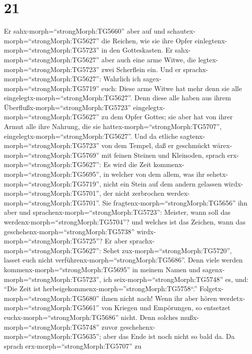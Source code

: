 \hypertarget{section-20}{%
\section{21}\label{section-20}}

 Er sahx-morph=``strongMorph:TG5660'' aber auf und
schautex-morph=``strongMorph:TG5627'' die Reichen, wie sie ihre Opfer
einlegtenx-morph=``strongMorph:TG5723'' in den Gotteskasten.
 Er sahx-morph=``strongMorph:TG5627'' aber auch eine arme
Witwe, die legtex-morph=``strongMorph:TG5723'' zwei Scherflein ein.
 Und er sprachx-morph=``strongMorph:TG5627'': Wahrlich ich
sagex-morph=``strongMorph:TG5719'' euch: Diese arme Witwe hat mehr denn
sie alle eingelegtx-morph=``strongMorph:TG5627''.  Denn
diese alle haben aus ihrem Überflußx-morph=``strongMorph:TG5723''
eingelegtx-morph=``strongMorph:TG5627'' zu dem Opfer Gottes; sie aber
hat von ihrer Armut alle ihre Nahrung, die sie
hattex-morph=``strongMorph:TG5707'',
eingelegtx-morph=``strongMorph:TG5627''.  Und da etliche
sagtenx-morph=``strongMorph:TG5723'' von dem Tempel, daß er geschmückt
wärex-morph=``strongMorph:TG5769'' mit feinen Steinen und Kleinoden,
sprach erx-morph=``strongMorph:TG5627'':  Es wird die Zeit
kommenx-morph=``strongMorph:TG5695'', in welcher von dem allem, was ihr
sehetx-morph=``strongMorph:TG5719'', nicht ein Stein auf dem andern
gelassen wirdx-morph=``strongMorph:TG5701'', der nicht zerbrochen
werdex-morph=``strongMorph:TG5701''.  Sie
fragtenx-morph=``strongMorph:TG5656'' ihn aber und
sprachenx-morph=``strongMorph:TG5723'': Meister, wann soll das
werdenx-morph=``strongMorph:TG5704''? und welches ist das Zeichen, wann
das geschehenx-morph=``strongMorph:TG5738''
wirdx-morph=``strongMorph:TG5725''?  Er aber
sprachx-morph=``strongMorph:TG5627'': Sehet
zux-morph=``strongMorph:TG5720'', lasset euch nicht
verführenx-morph=``strongMorph:TG5686''. Denn viele werden
kommenx-morph=``strongMorph:TG5695'' in meinem Namen und
sagenx-morph=``strongMorph:TG5723'', ich
seix-morph=``strongMorph:TG5748'' es, und: ``Die Zeit ist
herbeigekommenx-morph=''strongMorph:TG5758``.''
Folgetx-morph=``strongMorph:TG5680'' ihnen nicht nach!  Wenn
ihr aber hören werdetx-morph=``strongMorph:TG5661'' von Kriegen und
Empörungen, so entsetzet euchx-morph=``strongMorph:TG5686'' nicht. Denn
solches mußx-morph=``strongMorph:TG5748'' zuvor
geschehenx-morph=``strongMorph:TG5635''; aber das Ende ist noch nicht so
bald da.  Da sprach erx-morph=``strongMorph:TG5707'' zu
